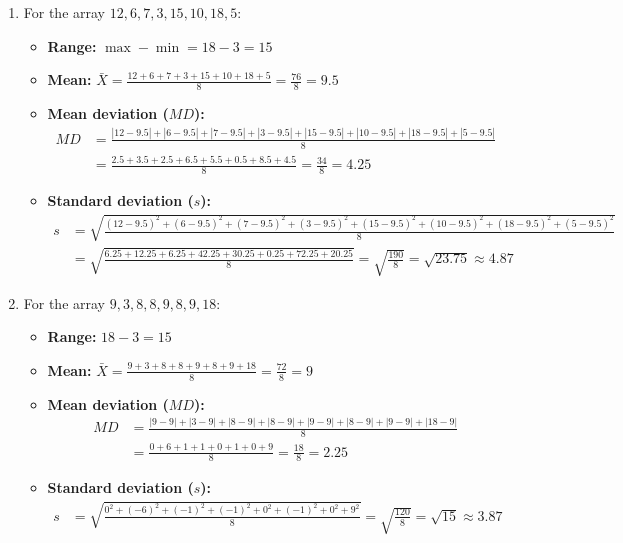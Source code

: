\begin{solproblema}[prob:ba2e465]
	\begin{enumerate}
		\item For the array $12,6,7,3,15,10,18,5$:
		\begin{itemize}
			\item \textbf{Range:} $\max - \min = 18 - 3 = 15$
			\item \textbf{Mean:} $\bar{X} = \frac{12+6+7+3+15+10+18+5}{8} = \frac{76}{8} = 9.5$
			\item \textbf{Mean deviation ($MD$):}
			\begin{align}
				MD &= \frac{|12-9.5| + |6-9.5| + |7-9.5| + |3-9.5| + |15-9.5| + |10-9.5| + |18-9.5| + |5-9.5|}{8} \\
				&= \frac{2.5 + 3.5 + 2.5 + 6.5 + 5.5 + 0.5 + 8.5 + 4.5}{8} = \frac{34}{8} = 4.25
			\end{align}
			\item \textbf{Standard deviation ($s$):}
			\begin{align}
				s &= \sqrt{\frac{(12-9.5)^2 + (6-9.5)^2 + (7-9.5)^2 + (3-9.5)^2 + (15-9.5)^2 + (10-9.5)^2 + (18-9.5)^2 + (5-9.5)^2}{8}} \\
				&= \sqrt{\frac{6.25 + 12.25 + 6.25 + 42.25 + 30.25 + 0.25 + 72.25 + 20.25}{8}} = \sqrt{\frac{190}{8}} = \sqrt{23.75} \approx 4.87
			\end{align}
		\end{itemize}

		\item For the array $9,3,8,8,9,8,9,18$:
		\begin{itemize}
			\item \textbf{Range:} $18 - 3 = 15$
			\item \textbf{Mean:} $\bar{X} = \frac{9+3+8+8+9+8+9+18}{8} = \frac{72}{8} = 9$
			\item \textbf{Mean deviation ($MD$):}
			\begin{align}
				MD &= \frac{|9-9| + |3-9| + |8-9| + |8-9| + |9-9| + |8-9| + |9-9| + |18-9|}{8} \\
				&= \frac{0 + 6 + 1 + 1 + 0 + 1 + 0 + 9}{8} = \frac{18}{8} = 2.25
			\end{align}
			\item \textbf{Standard deviation ($s$):}
			\begin{align}
				s &= \sqrt{\frac{0^2 + (-6)^2 + (-1)^2 + (-1)^2 + 0^2 + (-1)^2 + 0^2 + 9^2}{8}} = \sqrt{\frac{120}{8}} = \sqrt{15} \approx 3.87
			\end{align}
		\end{itemize}
	\end{enumerate}
\end{solproblema}

